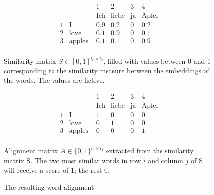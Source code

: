 \begin{figure}
\[
	\begin{array}{rl|c|c|c|c}
& &1 & 2 & 3 & 4\\
& &\text{Ich} & \text{liebe} & \text{ja} & \text{Äpfel} \\
\hline
1 & \text{I} & 0.9 & 0.2 & 0 &0.2 \\ 
\hline
2 & \text{love} & 0.1 & 0.9 &0 & 0.1 \\
\hline
3 & \text{apples } & 0.1& 0.1 & 0 & 0.9\\
\end{array}
\]
\captionsetup{width=.6\linewidth}
\caption[Similarity matrix]{Similarity matrix $S \in [0,1]^{l_e \times l_x}$, filled with values between 0 and 1 corresponding to the similarity measure between the embeddings of the words. 
The values are fictive.}
\label{fig:sim-matrix}
\end{figure}

\begin{figure}
\[
	\begin{array}{rl|c|c|c|c}
& &1 & 2 & 3 & 4\\
& &\text{Ich} & \text{liebe} & \text{ja} & \text{Äpfel} \\
\hline
1 & \text{I} & 1 & 0 & 0 & 0 \\ 
\hline
2 & \text{love} & 0 & 1 &0 & 0 \\
\hline
3 & \text{apples } & 0& 0 & 0 & 1\\
\end{array}
\]
\captionsetup{width=.6\linewidth}
\caption[Alignment matrix]{Alignment matrix $A \in \{0,1\}^{l_e \times l_f}$ extracted from the similarity matrix S. The two most similar words in row $i$ and column $j$ of S will receive a score of 1; the rest 0.}
\label{fig:al-matrix}
\end{figure}
\begin{figure}
\centering

    

\vspace*{1cm}

   
\caption{The resulting word alignment}
\label{fig:resulting-alignment}
\end{figure}


